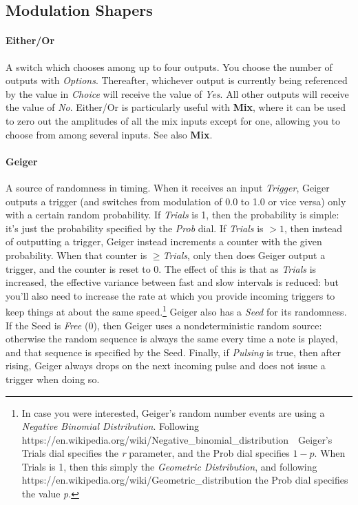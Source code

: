\documentclass{article}
\begin{document}



\subsection{Modulation Shapers}

\paragraph{Either/Or}  A switch which chooses among up to four outputs.  You choose the number of outputs with {\it Options}.  Thereafter, whichever output is currently being referenced by the value in {\it Choice} will receive the value of {\it Yes}.  All other outputs will receive the value of {\it No}.  Either/Or is particularly useful with {\bf Mix}, where it can be used to zero out the amplitudes of all the mix inputs except for one, allowing you to choose from among several inputs.  See also {\bf Mix}.

\paragraph{Geiger}  A source of randomness in timing.  When it receives an input {\it Trigger}, Geiger outputs a trigger (and switches from modulation of 0.0 to 1.0 or vice versa) only with a certain random probability.  If {\it Trials} is 1, then the probability is simple: it's just the probability specified by the {\it Prob} dial.  If {\it Trials} is \(>1\), then instead of outputting a trigger, Geiger instead increments a counter with the given probability.  When that counter is  \(\geq\){\it Trials}, only then does Geiger output a trigger, and the counter is reset to 0.  The effect of this is that as {\it Trials} is increased, the effective variance between fast and slow intervals is reduced: but you'll also need to increase the rate at which you provide incoming triggers to keep things at about the same speed.\footnote{In case you were interested, Geiger's random number events are using a {\it Negative Binomial Distribution}.  Following https:/\!/en.wikipedia.org/wiki/Negative\_binomial\_distribution\ \ Geiger's Trials dial specifies the {\it r} parameter, and the Prob dial specifies \(1-p\).  When Trials is 1, then this simply the {\it Geometric Distribution}, and following https:/\!/en.wikipedia.org/wiki/Geometric\_distribution the Prob dial specifies the value {\it p}.}  Geiger also has a {\it Seed} for its randomness.  If the Seed is {\it Free} (0), then Geiger uses a nondeterministic random source: otherwise the random sequence is always the same every time a note is played, and that sequence is specified by the Seed.  Finally, if {\it Pulsing} is true, then after rising, Geiger always drops on the next incoming pulse and does not issue a trigger when doing so.
\end{document}
